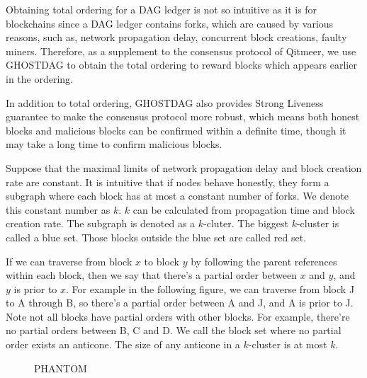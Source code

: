 \documentclass[a4paper,11pt]{article}
\begin{document}
Obtaining total ordering for a DAG ledger is not so intuitive as it is for
blockchains since a DAG ledger contains forks, which are caused by various reasons, such as, network
propagation delay, concurrent block creations, faulty miners.
Therefore, as a supplement to the consensus protocol of Qitmeer, we use GHOSTDAG to
obtain the total ordering to reward blocks which appears earlier in the
ordering.

In addition to total ordering, GHOSTDAG also provides Strong Liveness guarantee
to make the consensus protocol more robust, which means both honest blocks and
malicious blocks can be confirmed within a definite time, though it may take a
long time to confirm malicious blocks.

Suppose that the maximal limits of network propagation delay and block creation
rate are constant. It is intuitive that if nodes behave honestly, they form
a subgraph where each block has at most a constant number of forks. We denote
this constant number as $k$. $k$ can be calculated from propagation time and
block creation rate. The subgraph is denoted as a $k$-cluter. The biggest
$k$-cluster is called a blue set. Those blocks outside the blue set are called
red set.

If we can traverse from block $x$ to block $y$ by following the parent
references within each block, then we say that there's a partial order between
$x$ and $y$, and $y$ is prior to $x$. For example in the following figure, we
can traverse from block J to A through B, so there's a partial order between A
and J, and A is prior to J. Note not all blocks have partial orders with other
blocks. For example, there're no partial orders between B, C and D. We call the
block set where no partial order exists an anticone. The size of any anticone in
a $k$-cluster is at most $k$.

\begin{figure}[h]
	\centerline{%
	}
\caption{PHANTOM}
\end{figure}
\end{document}
